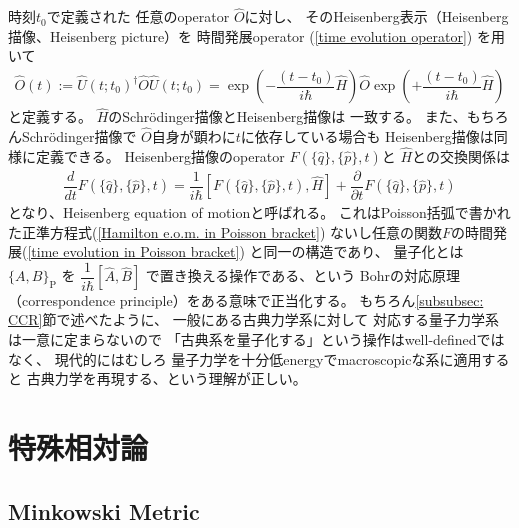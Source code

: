 時刻$t_0$で定義された
任意のoperator $\hat{O}$に対し、
そのHeisenberg表示（Heisenberg描像、Heisenberg picture）を
時間発展operator
(\ref{time evolution operator})
を用いて
\begin{align}
    \hat{O}(t)
    :=
    \hat{U} (t; t_0)^\dagger
        \hat{O}
    \hat{U} (t; t_0)
    =
    \exp\left(
        -\dfrac{ (t - t_0) }{i\hbar}
        \hat{H}
    \right)
        \hat{O}
    \exp\left(
        +\dfrac{ (t - t_0) }{i\hbar}
        \hat{H}
    \right)
\end{align}
と定義する。
$\hat{H}$のSchr\"odinger描像とHeisenberg描像は
一致する。
また、もちろんSchr\"odinger描像で
$\hat{O}$自身が顕わに$t$に依存している場合も
Heisenberg描像は同様に定義できる。
Heisenberg描像のoperator
$F(\{ \hat{q} \},\{ \hat{p} \}, t)$と
$\hat{H}$との交換関係は
\begin{align}
    \dfrac{d}{d t}
    F(\{ \hat{q} \},\{ \hat{p} \}, t)
    =
    \dfrac{1}{i\hbar}
    [F(\{ \hat{q} \},\{ \hat{p} \}, t), \hat{H}]
    + \dfrac{\partial}{\partial t}
    F(\{ \hat{q} \},\{ \hat{p} \}, t)
    \label{Heisenberg e.o.m}
\end{align}
となり、Heisenberg equation of motionと呼ばれる。
これはPoisson括弧で書かれた正準方程式(\ref{Hamilton e.o.m. in Poisson bracket})
ないし任意の関数$F$の時間発展(\ref{time evolution in Poisson bracket})
と同一の構造であり、
量子化とは
$\{A, B\}_{ \mathrm{P} }$
を
$\dfrac{1}{i\hbar} [\hat{A}, \hat{B}]$
で置き換える操作である、という
Bohrの対応原理（correspondence principle）をある意味で正当化する。
もちろん\ref{subsubsec: CCR}節で述べたように、
一般にある古典力学系に対して
対応する量子力学系は一意に定まらないので
「古典系を量子化する」という操作はwell-definedではなく、
現代的にはむしろ
量子力学を十分低energyでmacroscopicな系に適用すると
古典力学を再現する、という理解が正しい。

\newpage
\section{特殊相対論}

\subsection{Minkowski Metric}

